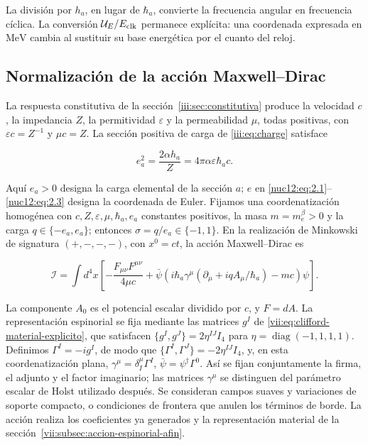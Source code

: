 La división por \(h_a\), en lugar de \(\hbar_a\), convierte la frecuencia angular en frecuencia cíclica. La conversión \(\mathcal U_E/E_{\rm clk}\) permanece explícita: una coordenada expresada en \(\mathrm{MeV}\) cambia al sustituir su base energética por el cuanto del reloj.

\subsection{Normalización de la acción Maxwell--Dirac}

La respuesta constitutiva de la sección~\ref{iii:sec:constitutiva} produce la velocidad \(c\), la impedancia \(Z\), la permitividad \(\varepsilon\) y la permeabilidad \(\mu\), todas positivas, con \(\varepsilon c=Z^{-1}\) y \(\mu c=Z\). La sección positiva de carga de \eqref{iii:eq:charge} satisface



\begin{equation}
e_a^2=\frac{2\alpha h_a}{Z}
=4\pi\alpha\varepsilon\hbar_a c .
\label{nuc12:eq:3.1}
\end{equation}



Aquí \(e_a>0\) designa la carga elemental de la sección \(a\); \(e\) en \eqref{nuc12:eq:2.1}--\eqref{nuc12:eq:2.3} designa la coordenada de Euler. Fijamos una coordenatización homogénea con \(c,Z,\varepsilon,\mu,\hbar_a,e_a\) constantes positivos, la masa \(m=m_e^\beta>0\) y la carga \(q\in\{-e_a,e_a\}\); entonces \(\sigma=q/e_a\in\{-1,1\}\). En la realización de Minkowski de signatura \((+,-,-,-)\), con \(x^0=ct\), la acción Maxwell--Dirac es



\begin{equation}
\mathcal I=\int d^4x\left[
-\frac{F_{\mu\nu}F^{\mu\nu}}{4\mu c}
+\bar\psi\left(i\hbar_a\gamma^\mu
(\partial_\mu+iqA_\mu/\hbar_a)-mc\right)\psi
\right].
\label{nuc12:eq:3.2}
\end{equation}



La componente \(A_0\) es el potencial escalar dividido por \(c\), y \(F=dA\). La representación espinorial se fija mediante las matrices \(g^I\) de \eqref{vii:eq:clifford-material-explicito}, que satisfacen \(\{g^I,g^J\}=2\eta^{IJ}I_4\) para \(\eta=\operatorname{diag}(-1,1,1,1)\). Definimos \(\Gamma^I=-ig^I\), de modo que \(\{\Gamma^I,\Gamma^J\}=-2\eta^{IJ}I_4\), y, en esta coordenatización plana, \(\gamma^\mu=\delta^\mu_I\Gamma^I\), \(\bar\psi=\psi^\dagger\Gamma^0\). Así se fijan conjuntamente la firma, el adjunto y el factor imaginario; las matrices \(\gamma^\mu\) se distinguen del parámetro escalar de Holst utilizado después. Se consideran campos suaves y variaciones de soporte compacto, o condiciones de frontera que anulen los términos de borde. La acción realiza los coeficientes ya generados y la representación material de la sección~\ref{vii:subsec:accion-espinorial-afin}.

